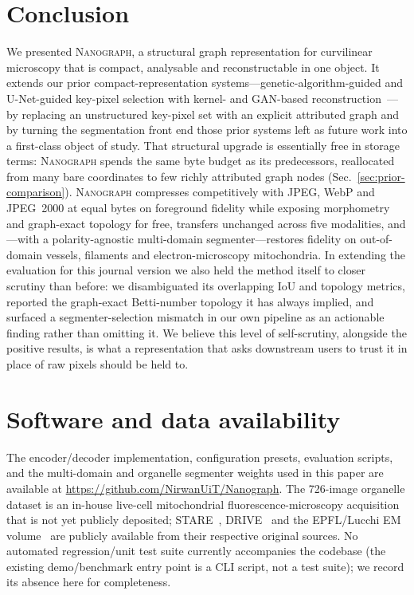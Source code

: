\documentclass[10pt,a4paper]{article}
\newcommand{\method}{\textnormal{\textsc{Nanograph}}\xspace}
\begin{document}
\section{Conclusion}
We presented \method, a structural graph representation for curvilinear
microscopy that is compact, analysable and reconstructable in one object. It
extends our prior compact-representation systems---genetic-algorithm-guided
and U-Net-guided key-pixel selection with kernel- and GAN-based
reconstruction~\cite{malakar2025eaai,banerjee2023acpr,banerjee2024gunetpp}---by
replacing an unstructured key-pixel set with an explicit attributed graph
and by turning the segmentation front end those prior systems left as future
work into a first-class object of study. That structural upgrade is
essentially free in storage terms: \method spends the same byte budget as
its predecessors, reallocated from many bare coordinates to few richly
attributed graph nodes (Sec.~\ref{sec:prior-comparison}). \method compresses competitively
with JPEG, WebP and JPEG~2000 at equal bytes on foreground fidelity while
exposing morphometry and graph-exact topology for free, transfers unchanged
across five modalities, and---with a polarity-agnostic multi-domain
segmenter---restores fidelity on out-of-domain vessels, filaments and
electron-microscopy mitochondria. In extending the evaluation for this
journal version we also held the method itself to closer scrutiny than
before: we disambiguated its overlapping IoU and topology metrics, reported
the graph-exact Betti-number topology it has always implied, and surfaced a
segmenter-selection mismatch in our own pipeline as an actionable finding
rather than omitting it. We believe this level of self-scrutiny, alongside
the positive results, is what a representation that asks downstream users to
trust it in place of raw pixels should be held to.

\section*{Software and data availability}
The encoder/decoder implementation, configuration presets, evaluation
scripts, and the multi-domain and organelle segmenter weights used in this
paper are available at \url{https://github.com/NirwanUiT/Nanograph}. The
726-image organelle dataset is an in-house live-cell mitochondrial
fluorescence-microscopy acquisition that is not yet publicly deposited; STARE~\cite{stare}, DRIVE~\cite{drive} and the
EPFL/Lucchi EM volume~\cite{lucchi} are publicly available from their
respective original sources. No automated regression/unit test suite
currently accompanies the codebase (the existing demo/benchmark entry point
is a CLI script, not a test suite); we record its absence here for completeness.
\end{document}
